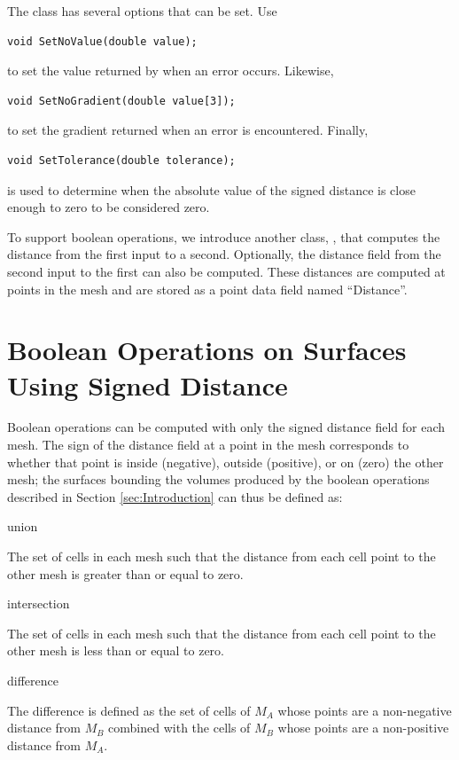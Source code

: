\documentclass{InsightArticle}
\begin{document}
The class  has several options that can be set. Use
\begin{verbatim}
void SetNoValue(double value);
\end{verbatim}
to set the value returned by  when an error occurs. Likewise,
\begin{verbatim}
void SetNoGradient(double value[3]);
\end{verbatim}
to set the gradient returned when an error is encountered. Finally,
\begin{verbatim}
void SetTolerance(double tolerance);
\end{verbatim}
is used to determine when the absolute value of the signed distance is close enough to zero to be considered zero.

To support boolean operations, we introduce another class, , that computes the distance from the first input  to a second. Optionally, the distance field from the second input  to the first can also be computed. These distances are computed at points in the mesh and are stored as a point data field named ``Distance''.

\section{Boolean Operations on Surfaces Using Signed Distance}

Boolean operations can be computed with only the signed distance field for each mesh. The sign of the distance field at a point in the mesh corresponds to whether that point is inside (negative), outside (positive), or on (zero) the other mesh; the surfaces bounding the volumes produced by the boolean operations described in Section \ref{sec:Introduction} can thus be defined as:

\begin{description}

\item union

The set of cells in each mesh such that the distance from each cell point to the other mesh is greater than or equal to zero.

\item intersection

The set of cells in each mesh such that the distance from each cell point to the other mesh is less than or equal to zero.

\item difference

The difference is defined as the set of cells of $M_A$ whose points are a non-negative distance from $M_B$ combined with the cells of $M_B$ whose points are a non-positive distance from $M_A$.

\end{description}
\end{document}
